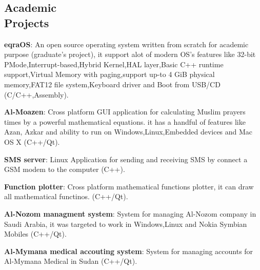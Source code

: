 \documentclass[margin,line]{resume}
\begin{document}
\begin{resume}




    \section{\mysidestyle Academic\\ Projects}

\textbf{eqraOS}: An open source operating system written from scratch for academic purpose (graduate's project), it support alot of modern OS’s features like 32-bit PMode,Interrupt-based,Hybrid Kernel,HAL layer,Basic C++ runtime support,Virtual Memory with paging,support up-to 4 GiB physical memory,FAT12 file system,Keyboard driver and Boot from USB/CD (C/C++,Assembly).
\vspace{-2mm}


\textbf{Al-Moazen}: Cross platform GUI application for calculating Muslim prayers times by a powerful mathematical equations. it has a handful of features like Azan, Azkar and ability to run on Windows,Linux,Embedded devices and Mac OS X (C++/Qt).
\vspace{-2mm}


\textbf{SMS server}: Linux Application for sending and receiving SMS by connect a GSM modem to the computer (C++).
\vspace{-2mm}

\textbf{Function plotter}: Cross platform mathematical functions plotter, it can draw all mathematical functinos. (C++/Qt).
\vspace{-2mm}

\textbf{Al-Nozom managment system}: System for managing Al-Nozom company in Saudi Arabia, it was targeted to work in Windows,Linux and Nokia Symbian Mobiles (C++/Qt).
\vspace{-2mm}

\textbf{Al-Mymana medical accouting system}: System for managing accounts for Al-Mymana Medical in Sudan (C++/Qt).
\vspace{-2mm}


\end{resume}
\end{document}
